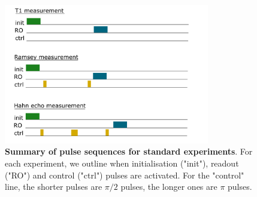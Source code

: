 \documentclass[a4paper,11pt]{article}
\begin{document}
\begin{figure}[h]
\centering
\includegraphics[width = 0.8\textwidth]{figures/pulse_sequence.png}
\caption{{\bf Summary of pulse sequences for standard experiments}. For each experiment, we outline when initialisation ("init"), readout ("RO") and control ("ctrl") pulses are activated. For the "control" line, the shorter pulses are $\pi/2$ pulses, the longer ones are $\pi$ pulses. }
\label{fig:pulse_sequences}
\end{figure}
\end{document}
